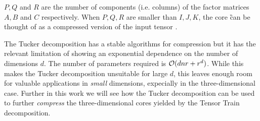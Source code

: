 $P, Q$ and $R$ are the number of components (i.e. columns) of the factor matrices $A, B$ and $C$ respectively. When $P,Q,R$ are smaller than $I,J,K$, the core \G can be thought of as a compressed version of the input tensor \X.

The Tucker decomposition has a stable algorithms for compression but it has the relevant limitation of showing an exponential dependence on the number of dimensions $d$. The number of parameters required is $\mathcal{O}(dnr+r^d)$.
While this makes the Tucker decomposition unsuitable for large $d$, this leaves enough room for valuable applications in \emph{small} dimensions, expecially in the three-dimensional case. Further in this work we will see how the Tucker decomposition can be used to further \emph{compress} the three-dimensional cores yielded by the Tensor Train decomposition.
